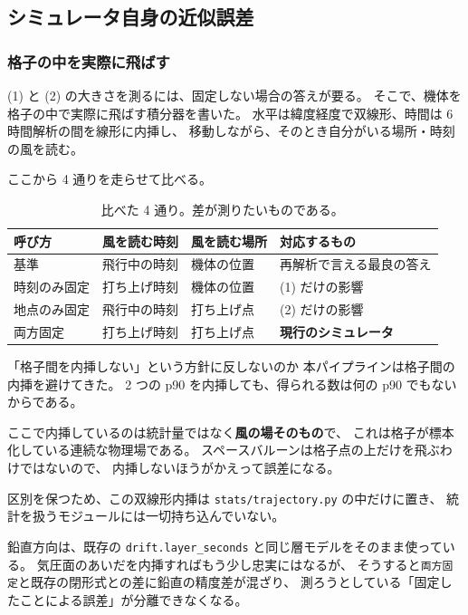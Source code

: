 \subsection{シミュレータ自身の近似誤差}
\label{sec:fidelity-error}

\subsubsection{格子の中を実際に飛ばす}

(1) と (2) の大きさを測るには、固定しない場合の答えが要る。
そこで、機体を格子の中で実際に飛ばす積分器を書いた。
水平は緯度経度で双線形、時間は 6 時間解析の間を線形に内挿し、
移動しながら、そのとき自分がいる場所・時刻の風を読む。

ここから 4 通りを走らせて比べる。

\begin{table}[H]
\centering
\caption{比べた 4 通り。差が測りたいものである。}
\label{tab:variants}
\begin{tabular}{@{}llll@{}}
\toprule
呼び方 & 風を読む時刻 & 風を読む場所 & 対応するもの \\
\midrule
基準 & 飛行中の時刻 & 機体の位置 & 再解析で言える最良の答え \\
時刻のみ固定 & 打ち上げ時刻 & 機体の位置 & (1) だけの影響 \\
地点のみ固定 & 飛行中の時刻 & 打ち上げ点 & (2) だけの影響 \\
両方固定 & 打ち上げ時刻 & 打ち上げ点 & \textbf{現行のシミュレータ} \\
\bottomrule
\end{tabular}
\end{table}

\begin{whybox}{「格子間を内挿しない」という方針に反しないのか}
本パイプラインは格子間の内挿を避けてきた。
2 つの p90 を内挿しても、得られる数は何の p90 でもないからである。

ここで内挿しているのは統計量ではなく\textbf{風の場そのもの}で、
これは格子が標本化している連続な物理場である。
スペースバルーンは格子点の上だけを飛ぶわけではないので、
内挿しないほうがかえって誤差になる。

区別を保つため、この双線形内挿は \texttt{stats/trajectory.py} の中だけに置き、
統計を扱うモジュールには一切持ち込んでいない。
\end{whybox}

鉛直方向は、既存の \texttt{drift.layer\_seconds} と同じ層モデルをそのまま使っている。
気圧面のあいだを内挿すればもう少し忠実にはなるが、
そうすると\texttt{両方固定}と既存の閉形式との差に鉛直の精度差が混ざり、
測ろうとしている「固定したことによる誤差」が分離できなくなる。

